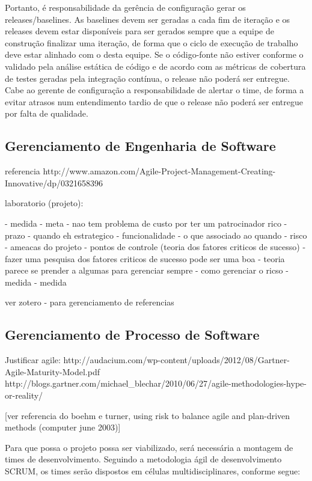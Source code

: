 \documentclass[12pt,journal,compsoc]{IEEEtran}
\begin{document}
Portanto, é responsabilidade da gerência de configuração gerar os releases/baselines. As baselines devem ser geradas a cada fim de iteração e os releases devem estar disponíveis para ser gerados sempre que a equipe de construção finalizar uma iteração, de forma que o ciclo de execução de trabalho deve estar alinhado com o desta equipe. Se o código-fonte não estiver conforme o validado pela análise estática de código e de acordo com as métricas de cobertura de testes geradas pela integração contínua, o release não poderá ser entregue. Cabe ao gerente de configuração a responsabilidade de alertar o time, de forma a evitar atrasos num entendimento tardio de que o release não poderá ser entregue por falta de qualidade.


\subsection{Gerenciamento de Engenharia de Software}

referencia 
  http://www.amazon.com/Agile-Project-Management-Creating-Innovative/dp/0321658396

  laboratorio (projeto):

  - medida
  - meta
    - nao tem problema de custo por ter um patrocinador rico
      - prazo - quando eh estrategico
      - funcionalidade - o que associado ao quando
  - risco 
      - ameacas do projeto
      - pontos de controle (teoria dos fatores criticos de sucesso)
          - fazer uma pesquisa dos fatores criticos de sucesso pode ser uma boa 
              - teoria parece se prender a algumas para gerenciar sempre
      - como gerenciar o ricso - medida
  - medida

ver zotero - para gerenciamento de referencias



\subsection{Gerenciamento de Processo de Software}

Justificar agile: 
http://audacium.com/wp-content/uploads/2012/08/Gartner-Agile-Maturity-Model.pdf
http://blogs.gartner.com/michael\_blechar/2010/06/27/agile-methodologies-hype-or-reality/

[ver referencia do boehm e turner, using risk to balance agile and plan-driven methods (computer june 2003)]

Para que possa o projeto possa ser viabilizado, será necessária a montagem de times de desenvolvimento. Seguindo a metodologia ágil de desenvolvimento SCRUM, os times serão dispostos em células multidisciplinares, conforme segue:
\end{document}

